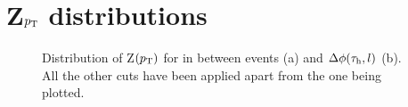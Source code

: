 \section{Z$p_\text{T}$ distributions}
\begin{figure}[ht]
	\centering
	\hfill
	\hfill
	\caption{Distribution of Z$(p_\text{T})$ for in between events (a) and $\Delta\phi(\tau_\text{h},l)$ (b). All the other cuts have been applied apart from the one being plotted.}
	\label{Fig21}
\end{figure}
